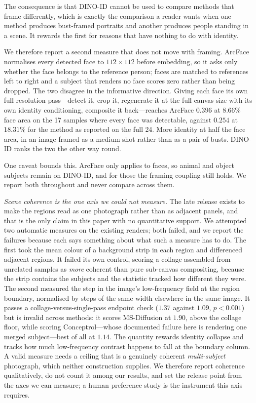 \documentclass[review,10pt,times]{elsarticle}
\begin{document}
The consequence is that DINO-ID cannot be used to compare methods that frame
differently, which is exactly the comparison a reader wants when one method
produces bust-framed portraits and another produces people standing in a
scene.  It rewards the first for reasons that have nothing to do with
identity.

We therefore report a second measure that does not move with framing.
ArcFace normalises every detected face to $112\times112$ before embedding, so
it asks only whether the face belongs to the reference person; faces are
matched to references left to right and a subject that renders no face scores
zero rather than being dropped.  The two disagree in the informative
direction.  Giving each face its
own full-resolution pass---detect it, crop it, regenerate it at the full canvas
size with its own identity conditioning, composite it back---reaches ArcFace
$0.396$ at $8.66\%$ face area on the 17 samples where every face was
detectable, against $0.254$ at $18.31\%$ for the method as reported on the
full 24.  More identity at half the face area, in an image framed as a medium
shot rather than as a pair of busts.  DINO-ID ranks the two the other way
round.

One caveat bounds this.  ArcFace only applies to faces, so animal and object
subjects remain on DINO-ID, and for those the framing coupling still holds.
We report both throughout and never compare across them.

\noindent\textit{Scene coherence is the one axis we could not measure.}
The late release exists to make the regions read as one photograph rather
than as adjacent panels, and that is the only claim in this paper with no
quantitative support.  We attempted two automatic measures on the existing
renders; both failed, and we report the failures because each says something
about what such a measure has to do.  The first took the mean colour of a
background strip in each region and differenced adjacent regions.  It failed
its own control, scoring a collage assembled from unrelated samples as
\emph{more} coherent than pure sub-canvas compositing, because the strip
contains the subjects and the statistic tracked how different they were.  The
second measured the step in the image's low-frequency field at the region
boundary, normalised by steps of the same width elsewhere in the same image.
It passes a collage-versus-single-pass endpoint check ($1.37$ against $1.09$,
$p{<}0.001$) but is invalid across methods: it scores MS-Diffusion at $1.90$,
above the collage floor, while scoring Conceptrol---whose documented failure
here is rendering one merged subject---best of all at $1.14$.  The quantity
rewards identity collapse and tracks how much low-frequency contrast happens
to fall at the boundary column.  A valid measure needs a ceiling that is a
genuinely coherent \emph{multi-subject} photograph, which neither
construction supplies.  We therefore report coherence qualitatively, do not
count it among our results, and set the release point from the axes we can
measure; a human preference study is the instrument this axis requires.
\end{document}
